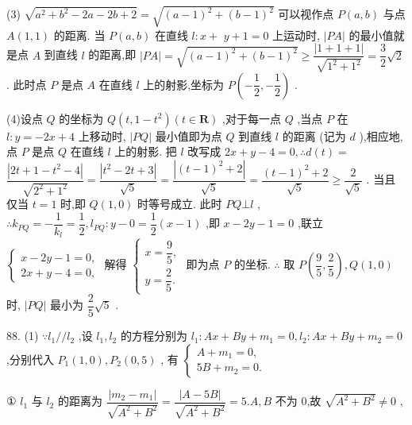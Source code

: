 (3) $\sqrt{{a}^{2} + {b}^{2} - {2a} - {2b} + 2} = \sqrt{{\left( a - 1\right) }^{2} + {\left( b - 1\right) }^{2}}$ 可以视作点 $P\left( {a,b}\right)$ 与点 $A\left( {1,1}\right)$ 的距离. 当 $P\left( {a,b}\right)$ 在直线 $l : x +$  $y + 1 = 0$ 上运动时, $\left| {PA}\right|$ 的最小值就是点 $A$ 到直线 $l$ 的距离,即 $\left| {PA}\right|  = \sqrt{{\left( a - 1\right) }^{2} + {\left( b - 1\right) }^{2}} \geq  \dfrac{\left| 1 + 1 + 1\right| }{\sqrt{{1}^{2} + {1}^{2}}} = \dfrac{3}{2}\sqrt{2}$ . 此时点 $P$ 是点 $A$ 在直线 $l$ 上的射影,坐标为 $P\left( {-\dfrac{1}{2}, - \dfrac{1}{2}}\right)$ .

(4)设点 $Q$ 的坐标为 $Q\left( {t,1 - {t}^{2}}\right) \left( {t \in  \mathbf{R}}\right)$ ,对于每一点 $Q$ ,当点 $P$ 在 $l : y =  - {2x} + 4$ 上移动时, $\left| {PQ}\right|$ 最小值即为点 $Q$ 到直线 $l$ 的距离 (记为 $d$ ),相应地,点 $P$ 是点 $Q$ 在直线 $l$ 上的射影. 把 $l$ 改写成 ${2x} + y - 4 = 0,\therefore d\left( t\right)  =$  $\dfrac{\left| 2t + 1 - {t}^{2} - 4\right| }{\sqrt{{2}^{2} + {1}^{2}}} = \dfrac{\left| {t}^{2} - 2t + 3\right| }{\sqrt{5}} = \dfrac{\left| {\left( t - 1\right) }^{2} + 2\right| }{\sqrt{5}} = \dfrac{{\left( t - 1\right) }^{2} + 2}{\sqrt{5}} \geq  \dfrac{2}{\sqrt{5}}$ . 当且仅当 $t = 1$ 时,即 $Q\left( {1,0}\right)$ 时等号成立. 此时 ${PQ} \bot  l$ , $\therefore {k}_{PQ} =  - \dfrac{1}{{k}_{l}} = \dfrac{1}{2},{l}_{PQ} : y - 0 = \dfrac{1}{2}\left( {x - 1}\right)$ ,即 $x - {2y} - 1 = 0$ ,联立 $\left\{  \begin{array}{l} x - {2y} - 1 = 0, \\  {2x} + y - 4 = 0, \end{array}\right.$ 解得 $\left\{  \begin{array}{l} x = \dfrac{9}{5}, \\  y = \dfrac{2}{5}. \end{array}\right.$ 即为点 $P$ 的坐标. $\therefore$ 取 $P\left( {\dfrac{9}{5},\dfrac{2}{5}}\right) ,Q\left( {1,0}\right)$ 时, $\left| {PQ}\right|$ 最小为 $\dfrac{2}{5}\sqrt{5}$ .

88. (1) $\because {l}_{1}//{l}_{2}$ ,设 ${l}_{1},{l}_{2}$ 的方程分别为 ${l}_{1} : {Ax} + {By} + {m}_{1} = 0,{l}_{2} : {Ax} + {By} + {m}_{2} = 0$ ,分别代入 ${P}_{1}\left( {1,0}\right) ,{P}_{2}\left( {0,5}\right)$ , 有 $\left\{  \begin{array}{l} A + {m}_{1} = 0, \\  {5B} + {m}_{2} = 0. \end{array}\right.$

① ${l}_{1}$ 与 ${l}_{2}$ 的距离为 $\dfrac{\left| {m}_{2} - {m}_{1}\right| }{\sqrt{{A}^{2} + {B}^{2}}} = \dfrac{\left| A - 5B\right| }{\sqrt{{A}^{2} + {B}^{2}}} = 5.A,B$ 不为 0,故 $\sqrt{{A}^{2} + {B}^{2}} \neq  0$ ,

